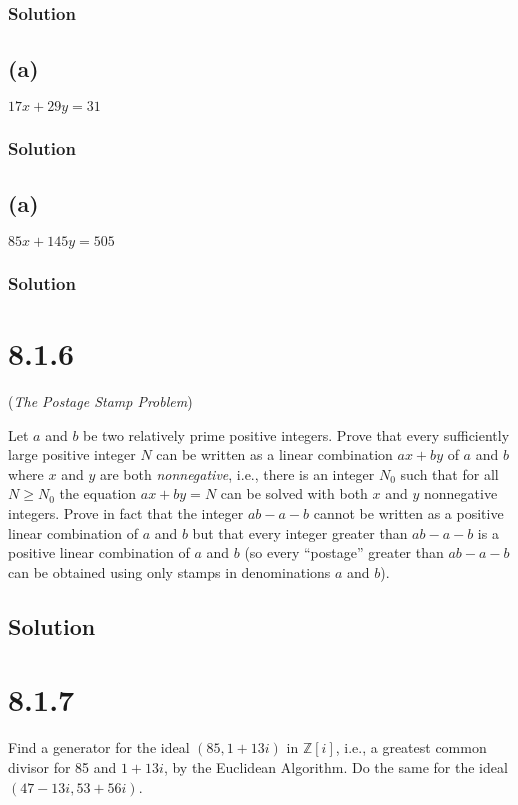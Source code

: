 \documentclass[fleqn]{article}
\begin{document}
            \subsubsection{Solution}
            
        
        \subsection{(a)}
        $17x + 29y = 31$
            
            \subsubsection{Solution}
            
        
        \subsection{(a)}
        $85x + 145y = 505$
        
            \subsubsection{Solution}
            
    
    \section{8.1.6}
    (\textit{The Postage Stamp Problem})
    
    Let $a$ and $b$ be two relatively prime positive integers.  Prove that every sufficiently large positive integer $N$ can be written as a linear combination $ax + by$ of $a$ and $b$ where $x$ and $y$ are both \textit{nonnegative}, i.e., there is an integer $N_0$ such that for all $N \geq N_0$ the equation $ax + by = N$ can be solved with both $x$ and $y$ nonnegative integers.  Prove in fact that the integer $ab - a - b$ cannot be written as a positive linear combination of $a$ and $b$ but that every integer greater than $ab - a - b$ is a positive linear combination of $a$ and $b$ (so every ``postage'' greater than $ab - a - b$ can be obtained using only stamps in denominations $a$ and $b$).
        
        \subsection{Solution}
        
    
    \section{8.1.7}
    Find a generator for the ideal $(85, 1 + 13i)$ in $\mathbb{Z}[i]$, i.e., a greatest common divisor for 85 and $1 + 13i$, by the Euclidean Algorithm.  Do the same for the ideal $(47 - 13i, 53 + 56i)$.
        
\end{document}
